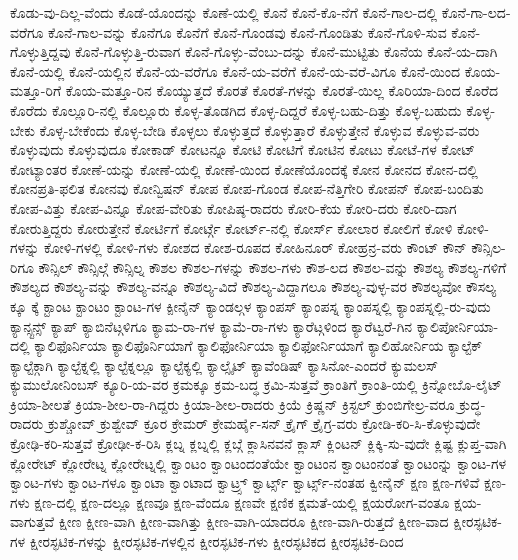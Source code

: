 {ಕೊಡು-ವು-ದಿಲ್ಲ-ವೆಂದು
ಕೊಡೆ-ಯೊಂದನ್ನು
ಕೊಣೆ-ಯಲ್ಲಿ
ಕೊನೆ
ಕೊನೆ-ಕೊ-ನೆಗೆ
ಕೊನೆ-ಗಾಲ-ದಲ್ಲಿ
ಕೊನೆ-ಗಾ-ಲದ-ವರೆಗೂ
ಕೊನೆ-ಗಾಲ-ವನ್ನು
ಕೊನೆಗೂ
ಕೊನೆಗೆ
ಕೊನೆ-ಗೊಂಡವು
ಕೊನೆ-ಗೊಂಡಿತು
ಕೊನೆ-ಗೊಳಿ-ಸುವ
ಕೊನೆ-ಗೊಳ್ಳುತ್ತಿದ್ದವು
ಕೊನೆ-ಗೊಳ್ಳುತ್ತಿ-ರುವಾಗ
ಕೊನೆ-ಗೊಳ್ಳು-ವೆಂಬು-ದನ್ನು
ಕೊನೆ-ಮುಟ್ಟಿತು
ಕೊನೆಯ
ಕೊನೆ-ಯ-ದಾಗಿ
ಕೊನೆ-ಯಲ್ಲಿ
ಕೊನೆ-ಯಲ್ಲಿನ
ಕೊನೆ-ಯ-ವರೆಗೂ
ಕೊನೆ-ಯ-ವರೆಗೆ
ಕೊನೆ-ಯ-ವರೆ-ವಿಗೂ
ಕೊನೆ-ಯಿಂದ
ಕೊಯ-ಮತ್ತೂ-ರಿಗೆ
ಕೊಯ-ಮತ್ತೂ-ರಿನ
ಕೊಯ್ಯುತ್ತದೆ
ಕೊರತೆ
ಕೊರತೆ-ಗಳನ್ನು
ಕೊರತೆ-ಯಿಲ್ಲ
ಕೊರಿಯಾ-ದಿಂದ
ಕೊರೆದ
ಕೊರೆದು
ಕೊಲ್ಲೂರಿ-ನಲ್ಲಿ
ಕೊಲ್ಲೂರು
ಕೊಳ್ಳ-ತೊಡಗಿದ
ಕೊಳ್ಳ-ದಿದ್ದರೆ
ಕೊಳ್ಳ-ಬಹು-ದಿತ್ತು
ಕೊಳ್ಳ-ಬಹುದು
ಕೊಳ್ಳ-ಬೇಕು
ಕೊಳ್ಳ-ಬೇಕೆಂದು
ಕೊಳ್ಳ-ಬೇಡಿ
ಕೊಳ್ಳಲು
ಕೊಳ್ಳುತ್ತದೆ
ಕೊಳ್ಳುತ್ತಾರೆ
ಕೊಳ್ಳುತ್ತೇನೆ
ಕೊಳ್ಳುವ
ಕೊಳ್ಳುವ-ವರು
ಕೊಳ್ಳುವುದು
ಕೊಳ್ಳುವುದೂ
ಕೋಕಾಡ್
ಕೋಟನ್ನೂ
ಕೋಟಿ
ಕೋಟಿಗೆ
ಕೋಟಿನ
ಕೋಟು
ಕೋಟೆ-ಗಳ
ಕೋಟ್
ಕೋಟ್ಯಾಂತರ
ಕೋಣೆ-ಯನ್ನು
ಕೋಣೆ-ಯಲ್ಲಿ
ಕೋಣೆ-ಯಿಂದ
ಕೋಣೆಯೊಂದಕ್ಕೆ
ಕೋನ
ಕೋನದ
ಕೋನ-ದಲ್ಲಿ
ಕೋನಪ್ರತಿ-ಫಲಿತ
ಕೋನವು
ಕೋನ್ವಿಷನ್
ಕೋಪ
ಕೋಪ-ಗೊಂಡ
ಕೋಪ-ನೆತ್ತಿಗೇರಿ
ಕೋಪನ್
ಕೋಪ-ಬಂದಿತು
ಕೋಪ-ವಿತ್ತು
ಕೋಪ-ವಿನ್ನೂ
ಕೋಪ-ವೇರಿತು
ಕೋಪಿಷ್ಠ-ರಾದರು
ಕೋರಿ-ಕೆಯ
ಕೋರಿ-ದರು
ಕೋರಿ-ದಾಗ
ಕೋರುತ್ತಿದ್ದರು
ಕೋರುತ್ತೇನೆ
ಕೋರ್ಟಿಗೆ
ಕೋರ್ಟ್ಗೆ
ಕೋರ್ಟ್-ನಲ್ಲಿ
ಕೋರ್ಸ್
ಕೋಲಾರ
ಕೋಲಿಗೆ
ಕೋಳಿ
ಕೋಳಿ-ಗಳನ್ನು
ಕೋಳಿ-ಗಳಲ್ಲಿ
ಕೋಳಿ-ಗಳು
ಕೋಶದ
ಕೋಶ-ರೂಪದ
ಕೋಹಿನೂರ್
ಕೋಹ್ರನ್ರ-ವರು
ಕೌಂಟ್
ಕೌನ್
ಕೌನ್ಸಿಲ-ರಿಗೂ
ಕೌನ್ಸಿಲ್
ಕೌನ್ಸಿಲ್ಗೆ
ಕೌನ್ಸಿಲ್ನ
ಕೌಶಲ
ಕೌಶಲ-ಗಳನ್ನು
ಕೌಶಲ-ಗಳು
ಕೌಶ-ಲದ
ಕೌಶಲ-ವನ್ನು
ಕೌಶಲ್ಯ
ಕೌಶಲ್ಯ-ಗಳಿಗೆ
ಕೌಶಲ್ಯದ
ಕೌಶಲ್ಯ-ವನ್ನು
ಕೌಶಲ್ಯ-ವನ್ನೂ
ಕೌಶಲ್ಯ-ವಿದೆ
ಕೌಶಲ್ಯ-ವಿದ್ದಾಗಲೂ
ಕೌಶಲ್ಯ-ವುಳ್ಳ-ವರ
ಕೌಶಲ್ಯವೋ
ಕೌಸಲ್ಯ
ಕ್ಕೂ
ಕ್ಕೆ
ಕ್ಟಾಂಟ
ಕ್ಟಾಂಟಂ
ಕ್ಟಾಂಟ-ಗಳ
ಕ್ಪೀನೈನ್
ಕ್ಯಾಂಡಲ್ಗಳ
ಕ್ಯಾಂಪಸ್
ಕ್ಯಾಂಪಸ್ನ
ಕ್ಯಾಂಪಸ್ನಲ್ಲಿ
ಕ್ಯಾಂಪಸ್ನಲ್ಲಿ-ರು-ವುದು
ಕ್ಯಾನ್ಸ್ಟನ್ಸ್
ಕ್ಯಾಪ್
ಕ್ಯಾಬಿನೆಟ್ಗಳಿಗೂ
ಕ್ಯಾಮ-ರಾ-ಗಳ
ಕ್ಯಾಮೆ-ರಾ-ಗಳು
ಕ್ಯಾರೆಟ್ಗಳಿಂದ
ಕ್ಯಾರೆಟ್ವರೆ-ಗಿನ
ಕ್ಯಾಲಿಪೋರ್ನಿಯಾ-ದಲ್ಲಿ
ಕ್ಯಾಲಿಫೊರ್ನಿಯಾ
ಕ್ಯಾಲಿಫೊರ್ನಿಯಾಗೆ
ಕ್ಯಾಲಿಫೋರ್ನಿಯಾ
ಕ್ಯಾಲಿಫೋರ್ನಿಯಾಗೆ
ಕ್ಯಾಲಿಹೋರ್ನಿಯ
ಕ್ಯಾಲ್ಟೆಕ್
ಕ್ಯಾಲ್ಟೆಕ್ಗಾಗಿ
ಕ್ಯಾಲ್ಟೆಕ್ನಲ್ಲಿ
ಕ್ಯಾಲ್ಟೆಕ್ನಲ್ಲೂ
ಕ್ಯಾಲ್ಟೆಕ್ಯಲ್ಲಿ
ಕ್ಯಾಲ್ಸೈಟ್
ಕ್ಯಾವೆಂಡಿಷ್
ಕ್ಯಾಸಿನೋ-ಎಂದರೆ
ಕ್ಯುಮಲಸ್
ಕ್ಯುಮುಲೋನಿಂಬಸ್
ಕ್ಯೂರಿ-ಯ-ವರ
ಕ್ರಮಕ್ಕೂ
ಕ್ರಮ-ಬದ್ಧ
ಕ್ರಮಿ-ಸುತ್ತವೆ
ಕ್ರಾಂತಿಗೆ
ಕ್ರಾಂತಿ-ಯಲ್ಲಿ
ಕ್ರಿನ್ನೋಬೊ-ಲೈಟ್
ಕ್ರಿಯಾ-ಶೀಲತೆ
ಕ್ರಿಯಾ-ಶೀಲ-ರಾ-ಗಿದ್ದರು
ಕ್ರಿಯಾ-ಶೀಲ-ರಾದರು
ಕ್ರಿಯೆ
ಕ್ರಿಷ್ಣನ್
ಕ್ರಿಸ್ಟಲ್
ಕ್ರುಂಬಿಗೇಲ್ರ-ವರೂ
ಕ್ರುದ್ಧ-ರಾದರು
ಕ್ರುಶ್ಚೋವ್
ಕ್ರುಶ್ವೇವ್
ಕ್ರೂರ
ಕ್ರೇಮರ್
ಕ್ರೇಮರ್ಹೈ-ಸನ್
ಕ್ರೈಗ್
ಕ್ರೈಗ್ರ-ವರು
ಕ್ರೋಡಿ-ಕರಿ-ಸಿ-ಕೊಳ್ಳುವುದೇ
ಕ್ರೋಢಿ-ಕರಿ-ಸುತ್ತವೆ
ಕ್ರೋಢೀ-ಕ-ರಿಸಿ
ಕ್ಲಬ್ನ
ಕ್ಲಬ್ನಲ್ಲಿ
ಕ್ಲಬ್ಗೆ
ಕ್ಲಾಸಿನವನೆ
ಕ್ಲಾಸ್
ಕ್ಲಿಂಟನ್
ಕ್ಲಿಕ್ಕಿ-ಸು-ವುದೇ
ಕ್ಲಿಷ್ಟ
ಕ್ಲುಪ್ತ-ವಾಗಿ
ಕ್ಲೋರೇಟ್
ಕ್ಲೋರೇಟ್ನ
ಕ್ಲೋರೇಟ್ನಲ್ಲಿ
ಕ್ವಾಂಟಂ
ಕ್ವಾಂಟಂದಂತೆಯೇ
ಕ್ವಾಂಟಂನ
ಕ್ವಾಂಟಂನಂತೆ
ಕ್ವಾಂಟಂನ್ನು
ಕ್ವಾಂಟ-ಗಳ
ಕ್ವಾಂಟ-ಗಳು
ಕ್ವಾಂಟ-ಗಳೂ
ಕ್ವಾಂಟಾ
ಕ್ವಾಂಟಾದ
ಕ್ವಾಟ್ರ್ಸ್
ಕ್ವಾರ್ಟ್ಸ್
ಕ್ವಾರ್ಟ್ಸ್-ನಂತಹ
ಕ್ವೀನೈನ್
ಕ್ಷಣ
ಕ್ಷಣ-ಗಳಿವೆ
ಕ್ಷಣ-ಗಳು
ಕ್ಷಣ-ದಲ್ಲಿ
ಕ್ಷಣ-ದಲ್ಲೂ
ಕ್ಷಣವೂ
ಕ್ಷಣ-ವೆಂದೂ
ಕ್ಷಣವೇ
ಕ್ಷಣಿಕ
ಕ್ಷಮತೆ-ಯಲ್ಲಿ
ಕ್ಷಯರೋಗ-ವಂತೂ
ಕ್ಷಯ-ವಾಗುತ್ತವೆ
ಕ್ಷೀಣ
ಕ್ಷೀಣ-ವಾಗಿ
ಕ್ಷೀಣ-ವಾಗಿತ್ತು
ಕ್ಷೀಣ-ವಾಗಿ-ಯಾದರೂ
ಕ್ಷೀಣ-ವಾಗಿ-ರುತ್ತದೆ
ಕ್ಷೀಣ-ವಾದ
ಕ್ಷೀರಸ್ಫಟಿಕ-ಗಳ
ಕ್ಷೀರಸ್ಫಟಿಕ-ಗಳನ್ನು
ಕ್ಷೀರಸ್ಫಟಿಕ-ಗಳಲ್ಲಿನ
ಕ್ಷೀರಸ್ಫಟಿಕ-ಗಳು
ಕ್ಷೀರಸ್ಫಟಿಕದ
ಕ್ಷೀರಸ್ಫಟಿಕ-ದಿಂದ
}
